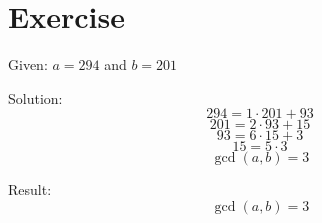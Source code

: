 \documentclass[a4paper, 10pt]{scrartcl}
\begin{document}
\section{Exercise}

Given: $a = 294$ and $b = 201$

Solution:
\[
    294 = 1\cdot 201 + 93
\]
\[
    201 = 2\cdot 93 + 15
\]
\[
    93 = 6\cdot 15 + 3
\]
\[
    15 = 5\cdot 3
\]
\[
    \gcd(a, b) = 3
\]

Result:
\[
    \gcd(a, b) = 3
\]
\end{document}

